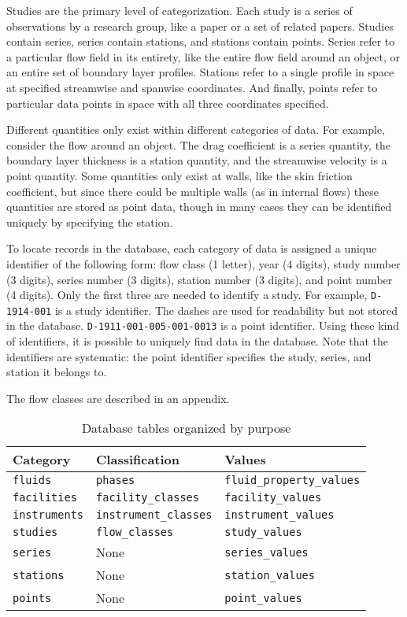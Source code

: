 Studies are the primary level of categorization.  Each study is a series of
observations by a research group, like a paper or a set of related papers.
Studies contain series, series contain stations, and stations contain points.
Series refer to a particular flow field in its entirety, like the entire flow
field around an object, or an entire set of boundary layer profiles.  Stations
refer to a single profile in space at specified streamwise and spanwise
coordinates.  And finally, points refer to particular data points in space with
all three coordinates specified.

Different quantities only exist within different categories of data.  For
example, consider the flow around an object.  The drag coefficient is a series
quantity, the boundary layer thickness is a station quantity, and the
streamwise velocity is a point quantity.  Some quantities only exist at walls,
like the skin friction coefficient, but since there could be multiple walls (as
in internal flows) these quantities are stored as point data, though in many
cases they can be identified uniquely by specifying the station.

To locate records in the database, each category of data is assigned a unique
identifier of the following form: flow class (1 letter), year (4 digits), study
number (3 digits), series number (3 digits), station number (3 digits), and
point number (4 digits).  Only the first three are needed to identify a study.
For example, \texttt{D-1914-001} is a study identifier.  The dashes are used
for readability but not stored in the database.
\texttt{D-1911-001-005-001-0013} is a point identifier.  Using these kind of
identifiers, it is possible to uniquely find data in the database.  Note that
the identifiers are systematic: the point identifier specifies the study,
series, and station it belongs to.

The flow classes are described in an appendix.

\begin{table}[p]
    \centering
    \begin{tabular}{ l | l l }
        Category              & Classification              & Values \\
        \hline
        \texttt{fluids}      & \texttt{phases}              & \texttt{fluid\_property\_values} \\
        \texttt{facilities}  & \texttt{facility\_classes}   & \texttt{facility\_values} \\
        \texttt{instruments} & \texttt{instrument\_classes} & \texttt{instrument\_values} \\
        \texttt{studies}     & \texttt{flow\_classes}       & \texttt{study\_values} \\
        \texttt{series}      & None                         & \texttt{series\_values} \\
        \texttt{stations}    & None                         & \texttt{station\_values} \\
        \texttt{points}      & None                         & \texttt{point\_values} \\
    \end{tabular}
    \caption{Database tables organized by purpose}
\end{table}


